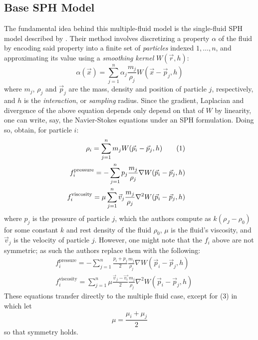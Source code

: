 \documentclass[acmtog,review]{acmart}
\newcommand\numberthis{\addtocounter{equation}{1}\tag{\theequation}}
\begin{document}
\subsection{Base SPH Model}
The fundamental idea behind this multiple-fluid model is the single-fluid SPH model described by \cite{muller3}. Their method involves discretizing a property $\alpha$ of the fluid by encoding said property into a finite set of \textit{particles} indexed $1, \ldots, n$, and approximating its value using a \textit{smoothing kernel} $W(\vec{r},h)$:
\begin{equation}
  \label{interp}
  \alpha(\vec{x}) = \sum_{j=1}^n \alpha_j \frac{m_j}{\rho_j} W(\vec{x} - \vec{p}_j, h)
\end{equation}
where $m_j$, $\rho_j$ and $\vec{p}_j$ are the mass, density and position of particle $j$, respectively, and $h$ is the \textit{interaction}, or \textit{sampling} radius. Since the gradient, Laplacian and divergence of the above equation depends only depend on that of $W$ by linearity, one can write, say, the Navier-Stokes equations under an SPH formulation. Doing so, \cite{muller3} obtain, for particle $i$: 
\begin{align*}
  \label{smoother}
  \rho_i = \sum_{j=1}^n m_j W(\vec{p}_i - \vec{p}_j, h) \numberthis \\
  f_i^{\text{pressure}} = -\sum_{j=1}^n p_j \frac{m_j}{\rho_j} \nabla W(\vec{p}_i - \vec{p}_j, h) && \\
  f_i^{\text{viscosity}} = \mu \sum_{j=1}^n \vec{v}_j \frac{m_j}{\rho_j} \nabla^2 W(\vec{p}_i - \vec{p}_j, h)
\end{align*}
where $p_j$ is the pressure of particle $j$, which the authors compute as $k(\rho_J - \rho_0)$ for some constant $k$ and rest density of the fluid $\rho_0$, $\mu$ is the fluid's viscosity, and $\vec{v}_j$ is the velocity of particle $j$. However, one might note that the $f_i$ above are not symmetric; as such the authors replace them with the following:
\begin{align}
  f_i^{\text{pressure}} = -\sum_{j=1}^n \frac{p_i + p_j}{2} \frac{m_j}{\rho_j} \nabla W(\vec{p}_i - \vec{p}_j, h) && \\
  f_i^{\text{viscosity}} = \sum_{j=1}^n \mu \frac{\vec{v}_j - \vec{v_i}}{2} \frac{m_j}{\rho_j} \nabla^2 W(\vec{p}_i - \vec{p}_j, h)
\end{align}
These equations transfer directly to the multiple fluid case, except for (3) in which \cite{muller5} let
\begin{equation*}
  \mu = \frac{\mu_i + \mu_j}{2}
\end{equation*}
so that symmetry holds. 
\end{document}
